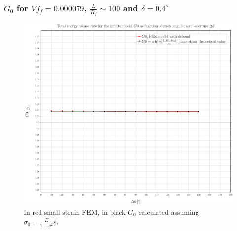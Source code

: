 \documentclass[first,firstsupp,lastsupp,handout,last,hyperref,table]{ETHclass}
\begin{document}
\begin{frame}
\frametitle{\small $G_{0}$ for $Vf_{f}=0.000079$, $\frac{L}{R_{f}}\sim100$ and $\delta=0.4^{\circ}$}
\vspace{-0.5cm}
\centering
\captionsetup[figure]{font=scriptsize,labelfont=scriptsize}
\begin{figure}[!h]
\centering
\includegraphics[height=0.7\textheight]{2017-06-16_AbqRunSummary_SingleFiberEqRfSmallStrain-D0-4_G0_Summary.pdf}
  \caption{\scriptsize In red small strain FEM, in black $G_{0}$ calculated assuming $\sigma_{0}=\frac{E}{1-\nu^{2}}\varepsilon$.}
  \label{fig:res1}
\end{figure}
\end{frame}

\end{document}
